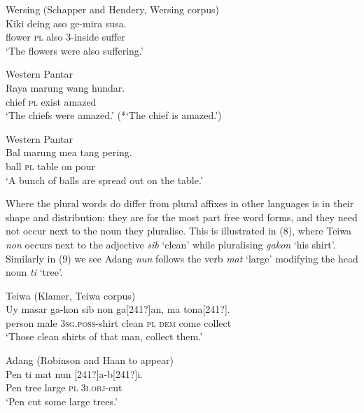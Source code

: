 \ea%
\label{ex:5}
Wersing (Schapper and Hendery, Wersing corpus)\\
\gll Kiki deing aso ge-mira susa. \\
  flower \textsc{pl} also 3-inside suffer  \\
\glt `The flowers were also suffering.'
 \z








\ea%
\label{ex:6}
Western Pantar \citep{Holton2012}\\
\gll  Raya marung wang hundar. \\
   chief \textsc{pl} exist amazed  \\
\glt `The chiefs were amazed.' (*`The chief is amazed.')
\z







\ea%
\label{ex:7}
Western Pantar \citep{Holton2012}\\
\gll Bal  marung mea tang pering.  \\
  ball \textsc{pl} table on pour   \\
\glt `A bunch of balls are spread out on the table.'
\z







Where the plural words do differ from plural affixes in other languages is in their shape and distribution: they are for the most part free word forms, and they need not occur next to the noun they pluralise. This is illustrated in (8), where Teiwa \textit{non} occurs next to the adjective \textit{sib} `clean' while pluralising \textit{gakon} `his shirt'. Similarly in (9) we see Adang \textit{nun} follows the verb \textit{mat}\textit{{\textepsilon}} `large' modifying the head noun \textit{ti} `tree'.


\ea%
Teiwa (Klamer, Teiwa corpus)\\
\label{ex:8}
\gll  Uy masar ga-kon  sib non ga{[241?]}{an,} ma {tona}{[241?]}{.}\\
   person male \textsc{3sg.poss}-shirt clean \textsc{pl} \textsc{dem} come collect\\
\glt `Those clean shirts of that man, collect them.'
\z







\ea%
Adang (Robinson and Haan to appear)\\
\label{ex:9}
\gll Pen ti {mat}{{\textepsilon}} nun [241?]a-b{{\textopeno}}{[241?]}{{\textopeno}}{i.} \\
   Pen tree large \textsc{pl} \textsc{3i.obj}-cut \\
\glt `Pen cut some large trees.'
\z






